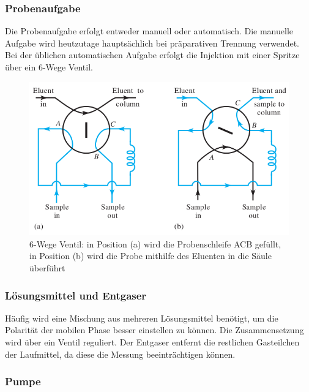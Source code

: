      \subsubsection{Probenaufgabe}
       
       Die Probenaufgabe erfolgt entweder manuell oder automatisch. Die manuelle Aufgabe wird heutzutage hauptsächlich bei präparativen Trennung verwendet. Bei der üblichen automatischen Aufgabe erfolgt die Injektion mit einer Spritze über ein 6-Wege Ventil. \citep{SkriptHPLC}
       
         \begin{figure}[H]
           \includegraphics[scale=0.3, center]{images/Funktionsweise6WegeVentil.png} 
           \caption[Beschreibung der Funktionsweise des 6-Wege Ventil, Quelle: ]{6-Wege Ventil: in Position (a) wird die Probenschleife ACB gefüllt, in Position (b) wird die Probe mithilfe des Eluenten in die Säule überführt}
           \label{fig:SechsWegeVentil}
         \end{figure}
         
     \subsubsection{Lösungsmittel und Entgaser}
       
       Häufig wird eine Mischung aus mehreren Lösungsmittel benötigt, um die Polarität der mobilen Phase besser einstellen zu können. Die Zusammensetzung wird über ein Ventil reguliert. Der Entgaser entfernt die restlichen Gasteilchen der Laufmittel, da diese die Messung beeinträchtigen können. \citep{InstrumentelleAnalytikSkoog}
       
     \subsubsection{Pumpe}
     
